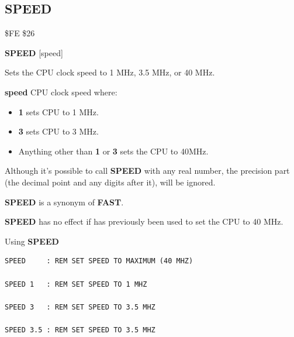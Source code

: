 
\newpage
\subsection{SPEED}
\begin{description}[leftmargin=2cm,style=nextline]
\item [Token:]    \$FE \$26

\item [Format:]   {\bf SPEED} [speed]

\item [Usage:]    Sets the CPU clock speed to 1 MHz, 3.5 MHz, or 40 MHz.

                  {\bf speed} CPU clock speed where:
                  \begin{itemize}
                     \item {\bf 1} sets CPU to 1 MHz.
                     \item {\bf 3} sets CPU to 3 MHz.
                     \item Anything other than {\bf 1} or {\bf 3} sets the CPU to 40MHz.
                  \end{itemize}

\item [Remarks:]  Although it's possible to call {\bf SPEED} with any real number, the precision part (the decimal point and any digits after it), will be ignored.

                  {\bf SPEED} is a synonym of {\bf FAST}.

                  {\bf SPEED} has no effect if  has previously been used to set the CPU to 40 MHz.

\item [Examples:] Using {\bf SPEED}

\begin{tcolorbox}[colback=black,coltext=white]
\verbatimfont{\codefont}
\begin{verbatim}
SPEED     : REM SET SPEED TO MAXIMUM (40 MHZ)

SPEED 1   : REM SET SPEED TO 1 MHZ

SPEED 3   : REM SET SPEED TO 3.5 MHZ

SPEED 3.5 : REM SET SPEED TO 3.5 MHZ
\end{verbatim}
\end{tcolorbox}
\end{description}


